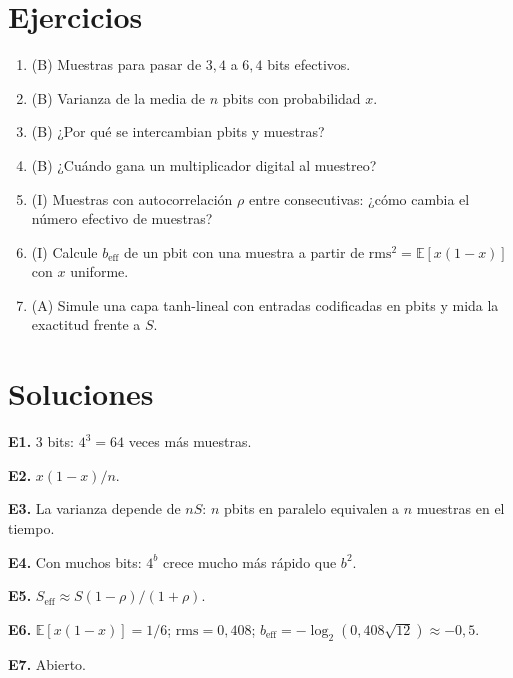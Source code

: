 \documentclass[11pt,a4paper]{article}
\begin{document}
\section{Ejercicios}
\begin{enumerate}[label=\textbf{E\arabic*.}]
\item (B) Muestras para pasar de $3{,}4$ a $6{,}4$ bits efectivos.
\item (B) Varianza de la media de $n$ pbits con probabilidad $x$.
\item (B) ¿Por qué se intercambian pbits y muestras?
\item (B) ¿Cuándo gana un multiplicador digital al muestreo?
\item (I) Muestras con autocorrelación $\rho$ entre consecutivas: ¿cómo cambia el número efectivo de muestras?
\item (I) Calcule $b_{\text{eff}}$ de un pbit con una muestra a partir de $\mathrm{rms}^2=\mathbb E[x(1-x)]$ con $x$ uniforme.
\item (A) Simule una capa tanh-lineal con entradas codificadas en pbits y mida la exactitud frente a $S$.
\end{enumerate}
\section{Soluciones}
\begin{solucion}
\textbf{E1.} 3 bits: $4^3=64$ veces más muestras.

\textbf{E2.} $x(1-x)/n$.

\textbf{E3.} La varianza depende de $nS$: $n$ pbits en paralelo equivalen a $n$ muestras en el tiempo.

\textbf{E4.} Con muchos bits: $4^b$ crece mucho más rápido que $b^2$.

\textbf{E5.} $S_{\text{eff}}\approx S(1-\rho)/(1+\rho)$.

\textbf{E6.} $\mathbb E[x(1-x)]=1/6$; $\mathrm{rms}=0{,}408$; $b_{\text{eff}}=-\log_2(0{,}408\sqrt{12})\approx-0{,}5$.

\textbf{E7.} Abierto.
\end{solucion}
\end{document}
